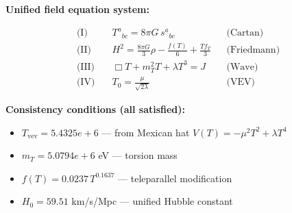
\textbf{Unified field equation system:}

\begin{align}
  \text{(I)} \quad & T^a{}_{bc} = 8\pi G \, s^a{}_{bc} && \text{(Cartan)} \\
  \text{(II)} \quad & H^2 = \frac{8\pi G}{3}\rho - \frac{f(T)}{6} + \frac{Tf_T}{3} && \text{(Friedmann)} \\
  \text{(III)} \quad & \Box T + m_T^2 T + \lambda T^3 = J && \text{(Wave)} \\
  \text{(IV)} \quad & T_0 = \frac{\mu}{\sqrt{2\lambda}} && \text{(VEV)}
\end{align}

\textbf{Consistency conditions (all satisfied):}
\begin{itemize}
  \item $T_{\text{vev}} = 5.4325e+6$ — from Mexican hat $V(T) = -\mu^2 T^2 + \lambda T^4$
  \item $m_T = 5.0794e+6$ eV — torsion mass
  \item $f(T) = 0.0237 \, T^{0.1637}$ — teleparallel modification
  \item $H_0 = 59.51$ km/s/Mpc — unified Hubble constant
\end{itemize}